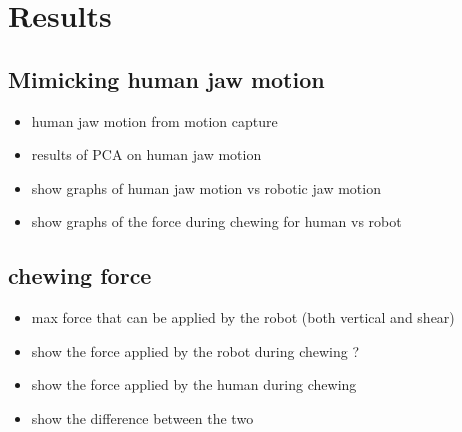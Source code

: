 \section{Results}
\subsection{Mimicking human jaw motion}
\begin{itemize}
    \item human jaw motion from motion capture
    \item results of PCA on human jaw motion
    \item show graphs of human jaw motion vs robotic jaw motion
    \item show graphs of the force during chewing for human vs robot
\end{itemize}

\subsection{chewing force}
\begin{itemize}
    \item max force that can be applied by the robot (both vertical and shear)
    \item show the force applied by the robot during chewing ?
    \item show the force applied by the human during chewing
    \item show the difference between the two
\end{itemize}
